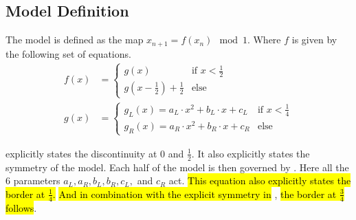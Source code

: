 \subsection{Model Definition}
\label{sec:setup.quad.def}

The model is defined as the map $x_{n+1} = f(x_n) \mod 1$.
Where $f$ is given by the following set of equations.
\begin{align}
	f(x) & = \begin{cases}
		         g(x)                             & \text{if } x < \frac{1}{2} \\
		         g(x - \frac{1}{2}) + \frac{1}{2} & \text{else}
	         \end{cases} \label{equ:quad.f}           \\
	g(x) & = \begin{cases}
		         g_L(x) = a_L \cdot x^2 + b_L \cdot x + c_L & \text{if } x < \frac{1}{4} \\
		         g_R(x) = a_R \cdot x^2 + b_R \cdot x + c_R & \text{else}
	         \end{cases} \label{equ:quad.g}
\end{align}

 explicitly states the discontinuity at $0$ and $\frac{1}{2}$.
It also explicitly states the symmetry of the model.
Each half of the model is then governed by .
Here all the 6 parameters $a_L, a_R, b_L, b_R, c_L,$ and $c_R$ act.
\hl{
	This equation also explicitly states the border at $\frac{1}{4}$.
}
\hl{And in combination with the explicit symmetry in} , \hl{the border at $\frac{3}{4}$ follows}.
